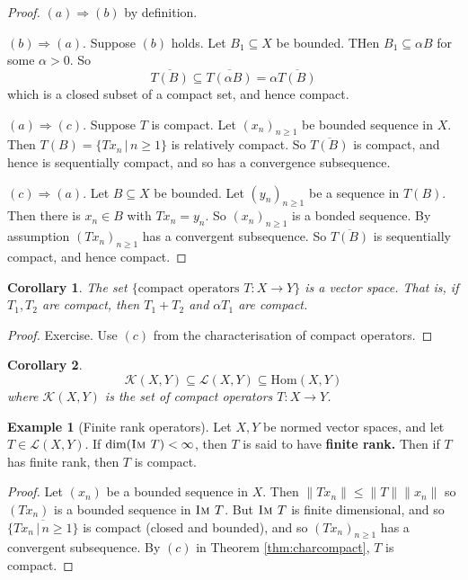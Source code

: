 \documentclass[10pt, oneside, reqno]{amsart}
\theoremstyle{plain}%
\newtheorem*{cor}{Corollary}
\theoremstyle{definition}
\newtheorem{exmp}[thm]{Example}
\theoremstyle{remark}
\newcommand{\given}{ \, | \,}
\newcommand{\im}{\textsc{Im\ }}
\begin{document}
\begin{proof}
    $(a) \Rightarrow (b)$ by definition.
    
    $(b) \Rightarrow (a)$.  Suppose $(b)$ holds.  Let $B_1 \subseteq X$ be bounded.  THen $B_1 \subseteq \alpha B$ for some $\alpha > 0$.  So \[
        \overline{T(B)} \subseteq \overline{T(\alpha B)} = \alpha \overline{T(B)}
    \] which is a closed subset of a compact set, and hence compact.  
    
    $(a) \Rightarrow (c)$.  Suppose $T$ is compact.  Let $(x_n)_{n \geq 1}$ be bounded sequence in $X$.  Then $T(B) = \{ Tx_n \given n \geq 1 \}$ is relatively compact.  So $\overline{T(B)}$ is compact, and hence is sequentially compact, and so has a convergence subsequence.
    
    $(c) \Rightarrow (a)$.  Let $B \subseteq X$ be bounded.  Let $(y_n)_{n \geq 1}$ be a sequence in $T(B)$.  Then there is $x_n \in B$ with $Tx_n = y_n$.  So $(x_n)_{n \geq 1}$ is a bonded sequence.  By assumption $(Tx_n)_{n \geq 1}$ has a convergent subsequence.  So $\overline{T(B)}$ is sequentially compact, and hence compact.
\end{proof}

\begin{cor}
    The set $\{ \text{compact operators $T : X \rightarrow Y$}\}$ is a vector space.  That is, if $T_1, T_2$ are compact, then $T_1 + T_2$ and $\alpha T_1$ are compact.  
\end{cor}

\begin{proof}
    Exercise.  Use $(c)$ from the characterisation of compact operators.
\end{proof}

\begin{cor}
    \[
        \mathcal K(X,Y) \subseteq \mathcal L(X, Y) \subseteq \text{Hom}(X,Y)
    \] where $\mathcal K(X,Y)$ is the set of compact operators $T : X \rightarrow Y$. 
\end{cor}

\begin{exmp}[Finite rank operators]  
    Let $X, Y$ be normed vector spaces, and let $T \in \mathcal L(X,Y)$.  If $\dim(\im T) < \infty$, then $T$ is said to have \textbf{finite rank.}  Then if $T$ has finite rank, then $T$ is compact.
\end{exmp}

\begin{proof}
    Let $(x_n)$ be a bounded sequence in $X$.  Then $\| Tx_n \| \leq \| T \| \| x_n \|$ so $(Tx_n)$ is a bounded sequence in $\im T$.  But $\im T$ is finite dimensional, and so $\overline{ \{ Tx_n \given n \geq 1 \}}$ is compact (closed and bounded), and so $(Tx_n)_{n \geq 1}$ has a convergent subsequence.  By $(c)$ in Theorem \ref{thm:charcompact}, $T$ is compact. 
\end{proof}
\end{document}
